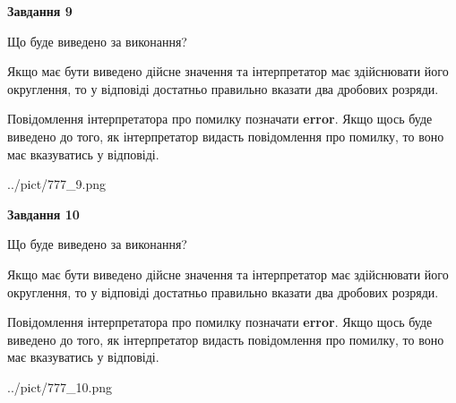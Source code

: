 \documentclass[12pt, ukrainian]{article}
\begin{document}
{\begin {Large}
{\begin {center}\textbf{Завдання 9}\end {center}}\par
Що буде виведено за виконання? \par

Якщо має бути виведено дійсне значення та інтерпретатор має здійснювати його округлення, 
то у відповіді достатньо правильно вказати два дробових розряди.

Повідомлення інтерпретатора про помилку позначати \textbf{error}.
Якщо щось буде виведено до того, як інтерпретатор видасть повідомлення про помилку, 
то воно має вказуватись у відповіді. \par

\begin{center}
	{../pict/777_9.png}
\end{center}
\newpage

{\begin {center}\textbf{Завдання 10}\end {center}}\par
Що буде виведено за виконання? \par

Якщо має бути виведено дійсне значення та інтерпретатор має здійснювати його округлення, 
то у відповіді достатньо правильно вказати два дробових розряди.

Повідомлення інтерпретатора про помилку позначати \textbf{error}.
Якщо щось буде виведено до того, як інтерпретатор видасть повідомлення про помилку, 
то воно має вказуватись у відповіді. \par

\begin{center}
	{../pict/777_10.png}
\end{center}
\newpage

\end {Large}}
\end{document}
